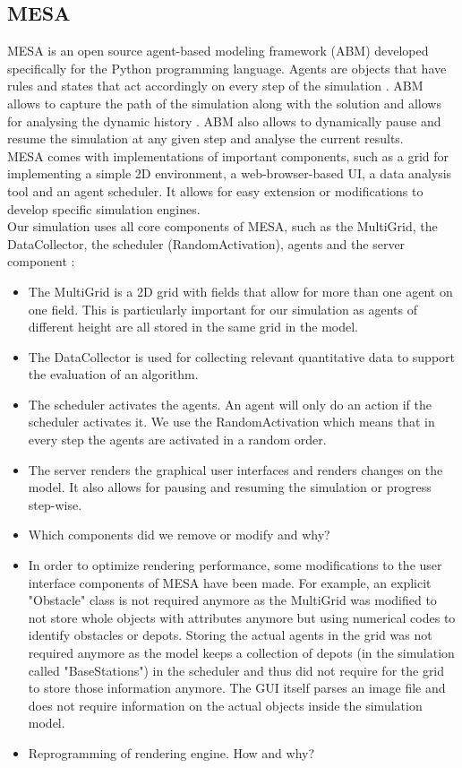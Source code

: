 \subsection{MESA}
MESA \cite{masad.2015} is an open source agent-based modeling framework (ABM) developed specifically for the Python programming language.  Agents are objects that have rules and states that act accordingly on every step of the simulation \cite{axtell.2000}. ABM allows to capture the path of the simulation along with the solution and allows for analysing the dynamic history \cite{axtell.2000}. ABM also allows to dynamically pause and resume the simulation at any given step and analyse the current results.\\
MESA comes with implementations of important components, such as a grid for implementing a simple 2D environment, a web-browser-based UI, a data analysis tool and an agent scheduler. It allows for easy extension or modifications to develop specific simulation engines. \\
Our simulation uses all core components of MESA, such as the MultiGrid, the DataCollector, the scheduler (RandomActivation), agents and the server component \cite{masad.2015}:
\begin{itemize}
	\item The MultiGrid is a 2D grid with fields that allow for more than one agent on one field. This is particularly important for our simulation as agents of different height are all stored in the same grid in the model.
	\item The DataCollector is used for collecting relevant quantitative data to support the evaluation of an algorithm.
	\item The scheduler activates the agents. An agent will only do an action if the scheduler activates it. We use the RandomActivation which means that in every step the agents are activated in a random order.
	\item The server renders the graphical user interfaces and renders changes on the model. It also allows for pausing and resuming the simulation or progress step-wise. 
\end{itemize} 
\begin{itemize}
	\item Which components did we remove or modify and why?
	\item In order to optimize rendering performance, some modifications to the user interface components of MESA have been made. For example, an explicit "Obstacle" class is not required anymore as the MultiGrid was modified to not store whole objects with attributes anymore but using numerical codes to identify obstacles or depots. Storing the actual agents in the grid was not required anymore as the model keeps a collection of depots (in the simulation called "BaseStations") in the scheduler and thus did not require for the grid to store those information anymore. The GUI itself parses an image file and does not require information on the actual objects inside the simulation model.
	\item Reprogramming of rendering engine. How and why?
\end{itemize}



